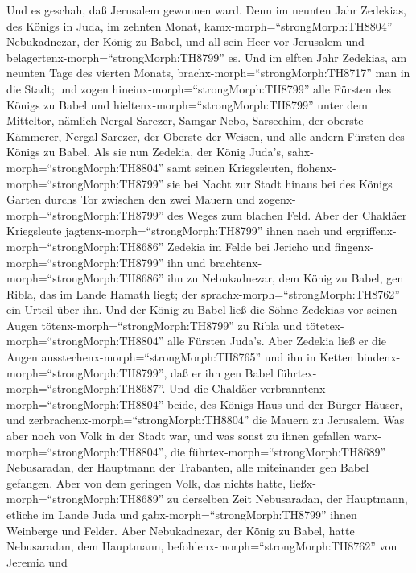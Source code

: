  Und es geschah, daß Jerusalem gewonnen ward. Denn im
neunten Jahr Zedekias, des Königs in Juda, im zehnten Monat,
kamx-morph=``strongMorph:TH8804'' Nebukadnezar, der König zu Babel, und
all sein Heer vor Jerusalem und belagertenx-morph=``strongMorph:TH8799''
es.  Und im elften Jahr Zedekias, am neunten Tage des
vierten Monats, brachx-morph=``strongMorph:TH8717'' man in die Stadt;
 und zogen hineinx-morph=``strongMorph:TH8799'' alle Fürsten
des Königs zu Babel und hieltenx-morph=``strongMorph:TH8799'' unter dem
Mitteltor, nämlich Nergal-Sarezer, Samgar-Nebo, Sarsechim, der oberste
Kämmerer, Nergal-Sarezer, der Oberste der Weisen, und alle andern
Fürsten des Königs zu Babel.  Als sie nun Zedekia, der König
Juda's, sahx-morph=``strongMorph:TH8804'' samt seinen Kriegsleuten,
flohenx-morph=``strongMorph:TH8799'' sie bei Nacht zur Stadt hinaus bei
des Königs Garten durchs Tor zwischen den zwei Mauern und
zogenx-morph=``strongMorph:TH8799'' des Weges zum blachen Feld.
 Aber der Chaldäer Kriegsleute
jagtenx-morph=``strongMorph:TH8799'' ihnen nach und
ergriffenx-morph=``strongMorph:TH8686'' Zedekia im Felde bei Jericho und
fingenx-morph=``strongMorph:TH8799'' ihn und
brachtenx-morph=``strongMorph:TH8686'' ihn zu Nebukadnezar, dem König zu
Babel, gen Ribla, das im Lande Hamath liegt; der
sprachx-morph=``strongMorph:TH8762'' ein Urteil über ihn. 
Und der König zu Babel ließ die Söhne Zedekias vor seinen Augen
tötenx-morph=``strongMorph:TH8799'' zu Ribla und
tötetex-morph=``strongMorph:TH8804'' alle Fürsten Juda's. 
Aber Zedekia ließ er die Augen ausstechenx-morph=``strongMorph:TH8765''
und ihn in Ketten bindenx-morph=``strongMorph:TH8799'', daß er ihn gen
Babel führtex-morph=``strongMorph:TH8687''.  Und die
Chaldäer verbranntenx-morph=``strongMorph:TH8804'' beide, des Königs
Haus und der Bürger Häuser, und zerbrachenx-morph=``strongMorph:TH8804''
die Mauern zu Jerusalem.  Was aber noch von Volk in der
Stadt war, und was sonst zu ihnen gefallen
warx-morph=``strongMorph:TH8804'', die
führtex-morph=``strongMorph:TH8689'' Nebusaradan, der Hauptmann der
Trabanten, alle miteinander gen Babel gefangen.  Aber von
dem geringen Volk, das nichts hatte, ließx-morph=``strongMorph:TH8689''
zu derselben Zeit Nebusaradan, der Hauptmann, etliche im Lande Juda und
gabx-morph=``strongMorph:TH8799'' ihnen Weinberge und Felder.
 Aber Nebukadnezar, der König zu Babel, hatte Nebusaradan,
dem Hauptmann, befohlenx-morph=``strongMorph:TH8762'' von Jeremia und
